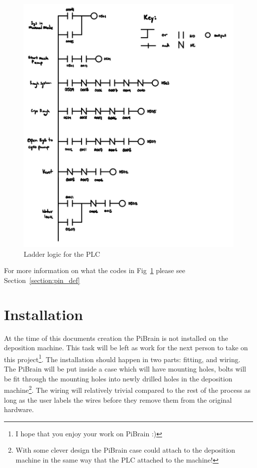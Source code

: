 \documentclass{article}
\begin{document}
\begin{center}
    \begin{figure}[h!]
      \includegraphics[scale=0.4]{IMG_0434.jpg}
      \caption{Ladder logic for the PLC}
      \label{fig:ladder}
    \end{figure}
\end{center}
For more information on what the codes in Fig~\ref{fig:ladder} please see Section~\ref{section:pin_def}

\section{Installation}
At the time of this documents creation the PiBrain is not installed on the deposition machine. This task will be left as work for the next person to take on this project\footnote{I hope that you enjoy your work on PiBrain :)}. The installation should happen in two parts: fitting, and wiring. The PiBrain will be put inside a case which will have mounting holes, bolts will be fit through the mounting holes into newly drilled holes in the deposition machine\footnote{With some clever design the PiBrain case could attach to the deposition machine in the same way that the PLC attached to the machine!}. The wiring will relatively trivial compared to the rest of the process as long as the user labels the wires before they remove them from the original hardware.
\end{document}
